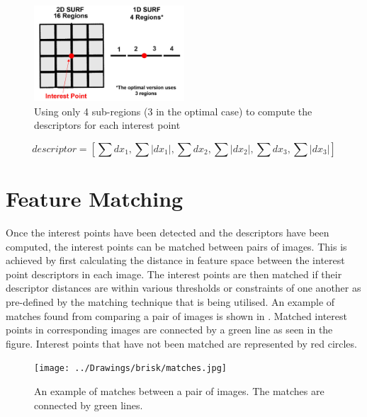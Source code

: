 \documentclass[11pt]{report}
\begin{document}
\begin{figure}[h!] 
  \centering
    \includegraphics[width=0.5\textwidth]{../Drawings/methods/SURF1D_Descriptor.jpg}
    \caption{Using only 4 sub-regions (3 in the optimal case) to compute the descriptors for each interest point}
    \label{fig:subregions4}
\end{figure}


\begin{equation}
descriptor = [ \sum dx_1, \sum |dx_1|,\sum dx_2, \sum |dx_2|,\sum dx_3, \sum |dx_3|] 
\label{eqn:descriptor1d}
\end{equation}


\chapter{Feature Matching}
\label{sec:matching}
Once the interest points have been detected and the descriptors have been computed, the interest points can be matched between pairs of images. This is achieved by first calculating the distance in feature space between the interest point descriptors in each image. The interest points are then matched if their descriptor distances are within various thresholds or constraints of one another as pre-defined by the matching technique that is being utilised. An example of matches found from comparing a pair of images is shown in . Matched interest points in corresponding images are connected by a green line as seen in the figure. Interest points that have not been matched are represented by red circles.\\

\begin{figure}[h!] 
  \centering
    \texttt{[image: ../Drawings/brisk/matches.jpg]}
    \caption{An example of matches between a pair of images. The matches are connected by green lines.}
    \label{fig:matchesIntro}
\end{figure}
\end{document}
